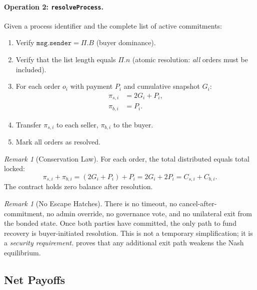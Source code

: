 \documentclass[11pt,a4paper]{article}
\theoremstyle{definition}
\theoremstyle{remark}
\newtheorem{remark}[theorem]{Remark}
\newcommand{\pay}{P}           %
\newcommand{\cumval}{G}        %
\begin{document}
\paragraph{Operation 2: \texttt{resolveProcess}.}
Given a process identifier and the complete list of active commitments:
\begin{enumerate}
  \item Verify $\texttt{msg.sender} = \Pi.B$ (buyer dominance).
  \item Verify that the list length equals $\Pi.n$ (atomic resolution:
    \emph{all} orders must be included).
  \item For each order $o_i$ with payment $\pay_i$ and cumulative snapshot
    $\cumval_i$:
    \begin{align}
      \pi_{s,i} &= 2\cumval_i + \pay_i, \label{eq:seller-payout} \\
      \pi_{b,i} &= \pay_i. \label{eq:buyer-payout}
    \end{align}
  \item Transfer $\pi_{s,i}$ to each seller, $\pi_{b,i}$ to the buyer.
  \item Mark all orders as resolved.
\end{enumerate}

\begin{remark}[Conservation Law]
\label{rem:conservation}
For each order, the total distributed equals total locked:
\begin{equation}
  \pi_{s,i} + \pi_{b,i} = (2\cumval_i + \pay_i) + \pay_i = 2\cumval_i + 2\pay_i = C_{s,i} + C_{b,i}.
\end{equation}
The contract holds zero balance after resolution.
\end{remark}

\begin{remark}[No Escape Hatches]
\label{rem:no-escape}
There is no timeout, no cancel-after-commitment, no admin override, no
governance vote, and no unilateral exit from the bonded state. Once both
parties have committed, the only path to fund recovery is buyer-initiated
resolution. This is not a temporary simplification; it is a
\emph{security requirement.}  proves
that any additional exit path weakens the Nash equilibrium.
\end{remark}

\subsection{Net Payoffs}
\end{document}
